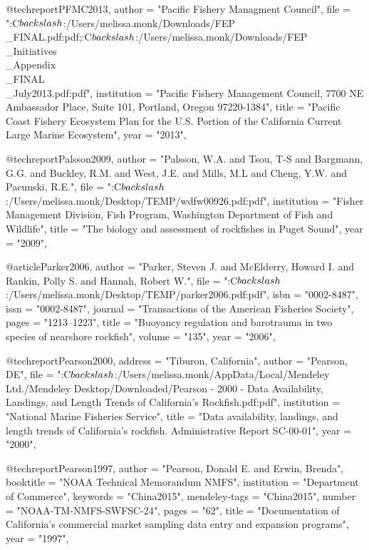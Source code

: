 @techreport{PFMC2013,
    author = "{{Pacific Fishery Managment Council}}",
    file = "{:C$\\backslash$:/Users/melissa.monk/Downloads/FEP\\_FINAL.pdf:pdf;:C$\\backslash$:/Users/melissa.monk/Downloads/FEP\\_Initiatives\\_Appendix\\_FINAL\\_July2013.pdf:pdf}",
    institution = "{Pacific Fishery Management Council, 7700 NE Ambassador Place, Suite 101, Portland, Oregon 97220-1384}",
    title = "{{Pacific Coast Fishery Ecosystem Plan for the U.S. Portion of the California Current Large Marine Ecosystem}}",
    year = "{2013}",
}

@techreport{Palsson2009,
    author = "{Palsson, W.A. and Tsou, T-S and Bargmann, G.G. and Buckley, R.M. and West, J.E. and Mills, M.L and Cheng, Y.W. and Pacunski, R.E.}",
    file = "{:C$\\backslash$:/Users/melissa.monk/Desktop/TEMP/wdfw00926.pdf:pdf}",
    institution = "{Fisher Management Division, Fish Program, Washington Department of Fish and Wildlife}",
    title = "{{The biology and assessment of rockfishes in Puget Sound}}",
    year = "{2009}",
}

@article{Parker2006,
    author = "{Parker, Steven J. and McElderry, Howard I. and Rankin, Polly S. and Hannah, Robert W.}",
    file = "{:C$\\backslash$:/Users/melissa.monk/Desktop/TEMP/parker2006.pdf:pdf}",
    isbn = "{0002-8487}",
    issn = "{0002-8487}",
    journal = "{Transactions of the American Fisheries Society}",
    pages = "{1213--1223}",
    title = "{{Buoyancy regulation and barotrauma in two species of nearshore rockfish}}",
    volume = "{135}",
    year = "{2006}",
}

@techreport{Pearson2000,
    address = "{Tiburon, California}",
    author = "{Pearson, DE}",
    file = "{:C$\\backslash$:/Users/melissa.monk/AppData/Local/Mendeley Ltd./Mendeley Desktop/Downloaded/Pearson - 2000 - Data Availability, Landings, and Length Trends of California's Rockfish.pdf:pdf}",
    institution = "{National Marine Fisheries Service}",
    title = "{{Data availability, landings, and length trends of California's rockfish. Administrative Report SC-00-01}}",
    year = "{2000}",
}

@techreport{Pearson1997,
    author = "{Pearson, Donald E. and Erwin, Brenda}",
    booktitle = "{NOAA Technical Memorandum NMFS}",
    institution = "{Department of Commerce}",
    keywords = "{China2015}",
    mendeley-tags = "{China2015}",
    number = "{NOAA-TM-NMFS-SWFSC-24}",
    pages = "{62}",
    title = "{{Documentation of California's commercial market sampling data entry and expansion programs}}",
    year = "{1997}",
}

